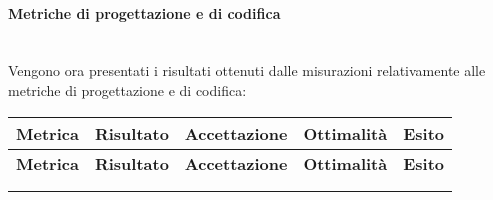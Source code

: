 \paragraph{Metriche di progettazione e di codifica}\mbox{}\\
Vengono ora presentati i risultati ottenuti dalle misurazioni relativamente alle metriche di progettazione e di codifica:
\begin{longtable}{|m{5cm}|c|c|c|c|}
	\hline \multicolumn{1}{|c|}{\textbf{Metrica}} & \multicolumn{1}{c|}{\textbf{Risultato}} & \multicolumn{1}{c|}{\textbf{Accettazione}} & \multicolumn{1}{c|}{\textbf{Ottimalità}} & \multicolumn{1}{c|}{\textbf{Esito}}\\
	\hline 
	\endfirsthead
	
	\hline \multicolumn{1}{|c|}{\textbf{Metrica}} & \multicolumn{1}{c|}{\textbf{Risultato}} & \multicolumn{1}{c|}{\textbf{Accettazione}} & \multicolumn{1}{c|}{\textbf{Ottimalità}} & \multicolumn{1}{c|}{\textbf{Esito}}\\
	\hline 
	\endhead
	
	\hline \multicolumn{5}{|r|}{\ToBeContinued} \\ 
	\hline
	\endfoot
	
	\hline
	\endlastfoot
	

\end{longtable}

